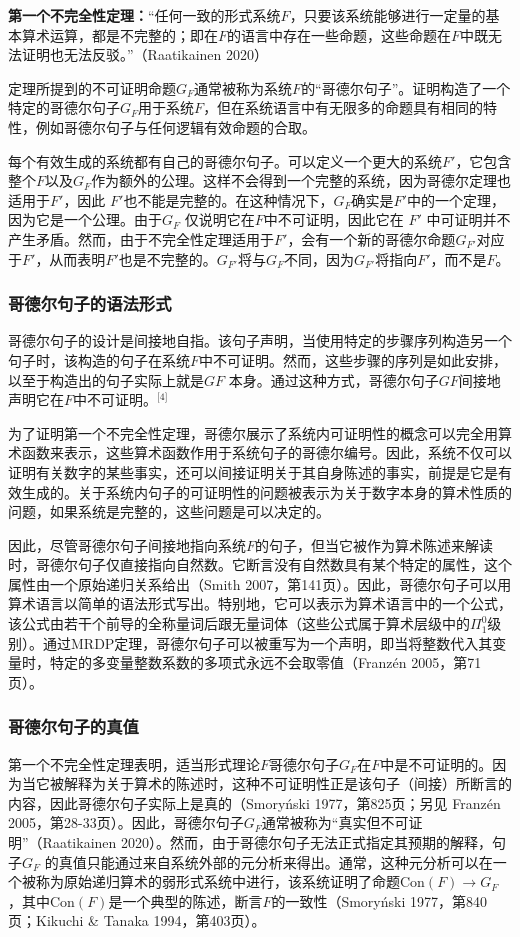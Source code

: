 \textbf{第一个不完全性定理：}“任何一致的形式系统\( F \)，只要该系统能够进行一定量的基本算术运算，都是不完整的；即在\( F \)的语言中存在一些命题，这些命题在\( F \)中既无法证明也无法反驳。”（Raatikainen 2020）

定理所提到的不可证明命题\( G_F \)通常被称为系统\( F \)的“哥德尔句子”。证明构造了一个特定的哥德尔句子\( G_F \)用于系统\( F \)，但在系统语言中有无限多的命题具有相同的特性，例如哥德尔句子与任何逻辑有效命题的合取。

每个有效生成的系统都有自己的哥德尔句子。可以定义一个更大的系统\( F' \)，它包含整个\( F \)以及\( G_F \)作为额外的公理。这样不会得到一个完整的系统，因为哥德尔定理也适用于\( F' \)，因此 \( F' \)也不能是完整的。在这种情况下，\( G_F \)确实是\( F' \)中的一个定理，因为它是一个公理。由于\( G_F \) 仅说明它在\( F \)中不可证明，因此它在 \( F' \) 中可证明并不产生矛盾。然而，由于不完全性定理适用于\( F' \)，会有一个新的哥德尔命题\( G_{F'} \)对应于\( F' \)，从而表明\( F' \)也是不完整的。\( G_{F'} \)将与\( G_F \)不同，因为\( G_{F'} \)将指向\( F' \)，而不是\( F \)。
\subsubsection{哥德尔句子的语法形式} 
哥德尔句子的设计是间接地自指。该句子声明，当使用特定的步骤序列构造另一个句子时，该构造的句子在系统\( F \)中不可证明。然而，这些步骤的序列是如此安排，以至于构造出的句子实际上就是\( GF \) 本身。通过这种方式，哥德尔句子\( GF \)间接地声明它在\( F \)中不可证明。\(^\text{[4]}\)

为了证明第一个不完全性定理，哥德尔展示了系统内可证明性的概念可以完全用算术函数来表示，这些算术函数作用于系统句子的哥德尔编号。因此，系统不仅可以证明有关数字的某些事实，还可以间接证明关于其自身陈述的事实，前提是它是有效生成的。关于系统内句子的可证明性的问题被表示为关于数字本身的算术性质的问题，如果系统是完整的，这些问题是可以决定的。

因此，尽管哥德尔句子间接地指向系统\( F \)的句子，但当它被作为算术陈述来解读时，哥德尔句子仅直接指向自然数。它断言没有自然数具有某个特定的属性，这个属性由一个原始递归关系给出（Smith 2007，第141页）。因此，哥德尔句子可以用算术语言以简单的语法形式写出。特别地，它可以表示为算术语言中的一个公式，该公式由若干个前导的全称量词后跟无量词体（这些公式属于算术层级中的\( \Pi_1^0 \)级别）。通过MRDP定理，哥德尔句子可以被重写为一个声明，即当将整数代入其变量时，特定的多变量整数系数的多项式永远不会取零值（Franzén 2005，第71页）。
\subsubsection{哥德尔句子的真值}  
第一个不完全性定理表明，适当形式理论\( F \)哥德尔句子\( G_F \)在\( F \)中是不可证明的。因为当它被解释为关于算术的陈述时，这种不可证明性正是该句子（间接）所断言的内容，因此哥德尔句子实际上是真的（Smoryński 1977，第825页；另见 Franzén 2005，第28-33页）。因此，哥德尔句子\( G_F \)通常被称为“真实但不可证明”（Raatikainen 2020）。然而，由于哥德尔句子无法正式指定其预期的解释，句子\( G_F \) 的真值只能通过来自系统外部的元分析来得出。通常，这种元分析可以在一个被称为原始递归算术的弱形式系统中进行，该系统证明了命题\( \text{Con}(F) \rightarrow G_F \)，其中\( \text{Con}(F) \)是一个典型的陈述，断言\( F \)的一致性（Smoryński 1977，第840页；Kikuchi & Tanaka 1994，第403页）。

